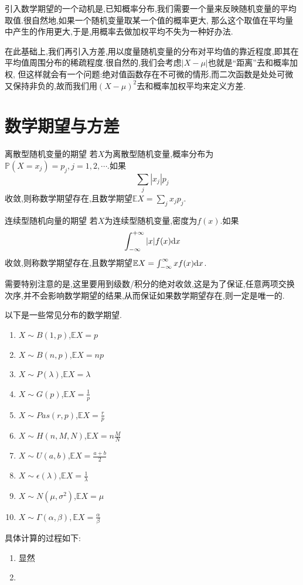 \documentclass[lang=cn,10pt]{elegantbook}
\begin{document}
引入数学期望的一个动机是,已知概率分布,我们需要一个量来反映随机变量的平均取值.很自然地,如果一个随机变量取某一个值的概率更大,
那么这个取值在平均量中产生的作用更大,于是,用概率去做加权平均不失为一种好办法.

在此基础上,我们再引入方差,用以度量随机变量的分布对平均值的靠近程度,即其在平均值周围分布的稀疏程度.很自然的,我们会考虑$|X-\mu|$也就是“距离”去和概率加权,
但这样就会有一个问题:绝对值函数存在不可微的情形,而二次函数是处处可微又保持非负的,故而我们用$(X-\mu)^2$去和概率加权平均来定义方差.

\section{数学期望与方差}
\begin{definition}{离散型随机变量的期望}{}
    若$X$为离散型随机变量,概率分布为$\mathbb{P}(X=x_j)=p_j,j=1,2,\cdots$.如果
    $$\sum_{j}\left|x_j\right|p_j$$
    收敛,则称数学期望存在,且数学期望$\mathbb{E}X=\sum_{j}x_jp_j$.
\end{definition}
\begin{definition}{连续型随机向量的期望}{}
    若$X$为连续型随机变量,密度为$f(x)$.如果
    $$\int_{-\infty}^{+\infty}|x|f(x){\rm d}x$$
    收敛,则称数学期望存在,且数学期望$\mathbb{E}X=\int_{-\infty}^{\infty}xf(x){\rm d}x$.
\end{definition}
需要特别注意的是,这里要用到级数/积分的绝对收敛,这是为了保证,任意两项交换次序,并不会影响数学期望的结果,从而保证如果数学期望存在,则一定是唯一的.

以下是一些常见分布的数学期望.
\begin{enumerate}
    \item $X\sim B(1,p)$,$\mathbb{E}X=p$
    \item $X\sim B(n,p)$,$\mathbb{E}X=np$
    \item $X\sim P(\lambda)$,$\mathbb{E}X=\lambda$
    \item $X\sim G(p)$,$\mathbb{E}X=\frac{1}{p}$
    \item $X\sim Pas(r,p)$,$\mathbb{E}X=\frac{r}{p}$
    \item $X\sim H(n,M,N)$,$\mathbb{E}X=n\frac{M}{N}$
    \item $X\sim U(a,b)$,$\mathbb{E}X=\frac{a+b}{2}$
    \item $X\sim \epsilon(\lambda)$,$\mathbb{E}X=\frac{1}{\lambda}$
    \item $X\sim N(\mu,\sigma^2)$,$\mathbb{E}X=\mu$
    \item $X\sim \Gamma(\alpha,\beta),\mathbb{E}X=\frac{\alpha}{\beta}$
\end{enumerate}
具体计算的过程如下:
\begin{enumerate}
    \item 显然
    \item 
\end{enumerate}
\end{document}
